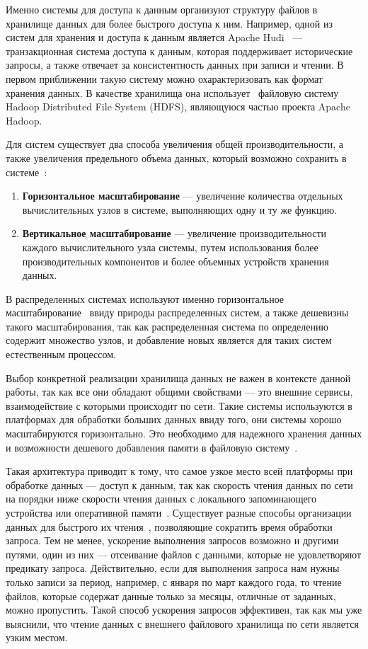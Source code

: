 Именно системы для доступа к данным организуют структуру файлов в хранилище данных для более быстрого доступа к ним. Например, одной из систем для хранения и доступа к данным является Apache Hudi~\cite{Hudi} --- транзакционная система доступа к данным, которая поддерживает исторические запросы, а также отвечает за консистентность данных при записи и чтении. В первом приближении такую систему можно охарактеризовать как формат хранения данных. В качестве хранилища она использует~\cite{Hudi} файловую систему Hadoop Distributed File System (HDFS), являющуюся частью проекта Apache Hadoop.

Для систем существует два способа увеличения общей производительности, а также увеличения предельного объема данных, который возможно сохранить в системе~\cite{Advanced_computer_architecture_and_parallel_processing}:
\begin{enumerate}
    \item \textbf{Горизонтальное масштабирование} ---  увеличение количества отдельных вычислительных узлов в системе, выполняющих одну и ту же функцию.
    \item \textbf{Вертикальное масштабирование} --- увеличение производительности каждого вычислительного узла системы, путем использования более производительных компонентов и более объемных устройств хранения данных.
\end{enumerate}

В распределенных системах используют именно горизонтальное масштабирование~\cite{Advanced_computer_architecture_and_parallel_processing} ввиду природы распределенных систем, а также дешевизны такого масштабирования, так как распределенная система по определению содержит множество узлов, и добавление новых является для таких систем естественным процессом.

Выбор конкретной реализации хранилища данных не важен в контексте данной работы, так как все они обладают общими свойствами --- это внешние  сервисы, взаимодействие с которыми происходит по сети. Такие системы используются в платформах для обработки больших данных ввиду того, они системы хорошо масштабируются горизонтально. Это необходимо для надежного хранения данных и возможности дешевого добавления памяти в файловую систему~\cite{Distributed_File_Systems_Architectures}.

Такая архитектура приводит к тому, что самое узкое место всей платформы при обработке данных --- доступ к данным, так как скорость чтения данных по сети на порядки ниже скорости чтения данных с локального запоминающего устройства или оперативной памяти~\cite{HOI_BigData}. Существует разные способы организации данных для быстрого их чтения~\cite{Column_oriented_database_systems}, позволяющие сократить время обработки запроса. Тем не менее, ускорение выполнения запросов возможно и другими путями, один из них --- отсеивание файлов с данными, которые не удовлетворяют предикату запроса. Действительно, если для выполнения запроса нам нужны только записи за период, например, с января по март каждого года, то чтение файлов, которые содержат данные только за месяцы, отличные от заданных, можно пропустить. Такой способ ускорения запросов эффективен, так как мы уже выяснили, что чтение данных с внешнего файлового хранилища по сети является узким местом.

